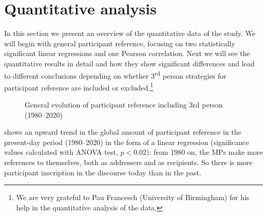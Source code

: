 \documentclass[output=paper]{langscibook}
\begin{document}
\section{Quantitative analysis}\label{sec:nogue:3}


In this section we present an overview of the quantitative data of the study. We will begin with general participant reference, focusing on two statistically significant linear regressions and one Pearson correlation. Next we will see the quantitative results in detail and how they show significant differences and lead to different conclusions depending on whether 3\textsuperscript{rd} person strategies for participant reference are included or excluded.\footnote{We are very grateful to Pau Francesch (University of Birmingham) for his help in the quantitative analysis of the data.}



  
 
\begin{figure}
\caption{General evolution of participant reference including 3rd person (1980--2020)\label{fig:nogue:1}}
\end{figure}



 shows an upward trend in the global amount of participant reference in the present-day period (1980–2020) in the form of a linear regression (significance values calculated with ANOVA test, $p < 0.02$): from 1980 on, the MPs make more references to themselves, both as addressers and as recipients. So there is more participant inscription in the discourse today than in the past.\largerpage
\end{document}
